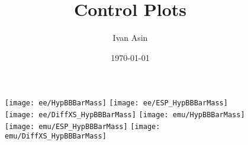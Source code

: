 \documentclass[12pt, a4paper, titlepage]{article}
\title{Control Plots}
\author{Ivan Asin}
\date{\today}
\begin{document}
\maketitle


\clearpage
\newpage



\begin{figure}
    \subfigure
    {
      \centering
      \texttt{[image: ee/HypBBBarMass]}
    }
    \subfigure
    {
      \centering
      \texttt{[image: ee/ESP\_HypBBBarMass]}
    }
    \subfigure
    {
      \centering
      \texttt{[image: ee/DiffXS\_HypBBBarMass]}
    }
    \subfigure
    {
      \centering
      \texttt{[image: emu/HypBBBarMass]}
    }
    \subfigure
    {
      \centering
      \texttt{[image: emu/ESP\_HypBBBarMass]}
    }
    \subfigure
    {
      \centering
      \texttt{[image: emu/DiffXS\_HypBBBarMass]}
    }
\end{figure}
\clearpage
\newpage
\end{document}
